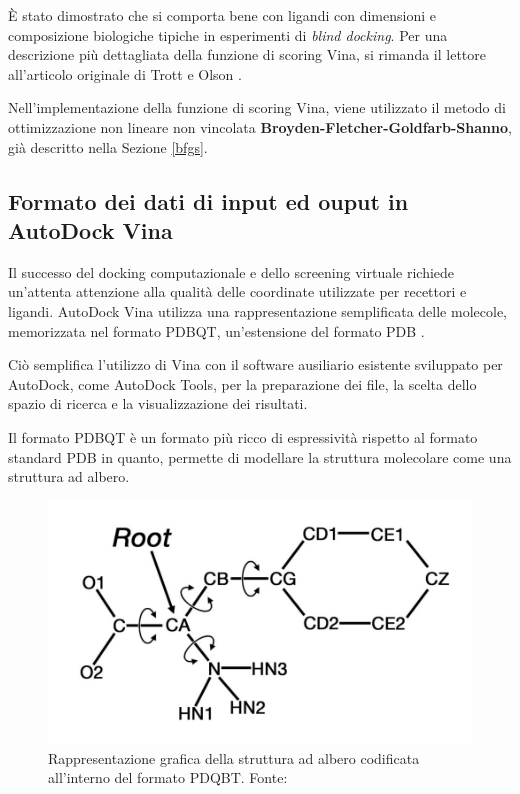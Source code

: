È stato dimostrato che si comporta bene con ligandi con dimensioni e composizione biologiche tipiche in esperimenti di \textit{blind docking}.
Per una descrizione più dettagliata della funzione di scoring Vina, si rimanda il lettore all'articolo originale di Trott e Olson \cite{trott_autodock_2009, quiroga_vinardo_2016}.

Nell'implementazione della funzione di scoring Vina, viene utilizzato il metodo di ottimizzazione non lineare non vincolata \textbf{Broyden-Fletcher-Goldfarb-Shanno}, già descritto nella Sezione \ref{bfgs}.
\subsection{Formato dei dati di input ed ouput in AutoDock Vina}
Il successo del docking computazionale e dello screening virtuale richiede un'attenta attenzione alla qualità delle coordinate utilizzate per recettori e ligandi. AutoDock Vina utilizza una rappresentazione semplificata delle molecole, memorizzata nel formato PDBQT, un'estensione del formato PDB \cite{forli_computational_2016}.

Ciò semplifica l'utilizzo di Vina con il software ausiliario esistente sviluppato per AutoDock, come AutoDock Tools, per la preparazione dei file, la scelta dello spazio di ricerca e la visualizzazione dei risultati. \cite{trott_autodock_2009}

Il formato PDBQT è un formato più ricco di espressività rispetto al formato standard PDB in quanto, permette di modellare la struttura molecolare come una struttura ad albero.

\begin{figure}[H]
    \centering
    \includegraphics[scale=0.5]{images/pdbqt.jpg}
    \caption[Rappresentazione grafica del formato PDQBT.]{Rappresentazione grafica della struttura ad albero codificata all'interno del formato PDQBT. Fonte: \cite{eberhardt_autodock_nodate}}
    \label{fig:pdbqt}
\end{figure}

